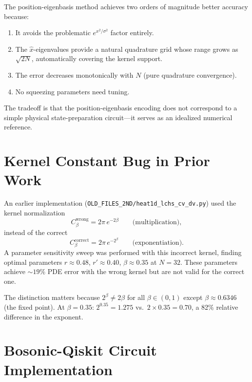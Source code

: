 \documentclass[11pt]{article}
\begin{document}
The position-eigenbasis method achieves two orders of magnitude better
accuracy because:
\begin{enumerate}[itemsep=3pt]
  \item It avoids the problematic $e^{x^2/\sigma^2}$ factor entirely.
  \item The $\hat{x}$-eigenvalues provide a natural quadrature grid whose
        range grows as $\sqrt{2N}$, automatically covering the kernel support.
  \item The error decreases monotonically with $N$ (pure quadrature convergence).
  \item No squeezing parameters need tuning.
\end{enumerate}

The tradeoff is that the position-eigenbasis encoding does not correspond
to a simple physical state-preparation circuit---it serves as an idealized
numerical reference.

\section{Kernel Constant Bug in Prior Work}\label{sec:kernel-bug}

An earlier implementation (\texttt{OLD\_FILES\_2ND/heat1d\_lchs\_cv\_dv.py})
used the kernel normalization
\begin{equation}
  C_\beta^{\text{wrong}} = 2\pi\,e^{-2\beta}
  \qquad\text{(multiplication)},
\end{equation}
instead of the correct
\begin{equation}
  C_\beta^{\text{correct}} = 2\pi\,e^{-2^\beta}
  \qquad\text{(exponentiation)}.
\end{equation}
A parameter sensitivity sweep was performed with this incorrect kernel,
finding optimal parameters $r \approx 0.48$, $r' \approx 0.40$,
$\beta \approx 0.35$ at $N = 32$.  These parameters achieve
$\sim\!19\%$ PDE error with the wrong kernel but are not valid for the
correct one.

The distinction matters because $2^\beta \neq 2\beta$ for all
$\beta \in (0,1)$ except $\beta \approx 0.6346$ (the fixed point).
At $\beta = 0.35$: $2^{0.35} = 1.275$ vs.\ $2\times0.35 = 0.70$,
a 82\% relative difference in the exponent.

\section{Bosonic-Qiskit Circuit Implementation}\label{sec:bosonic}
\end{document}
